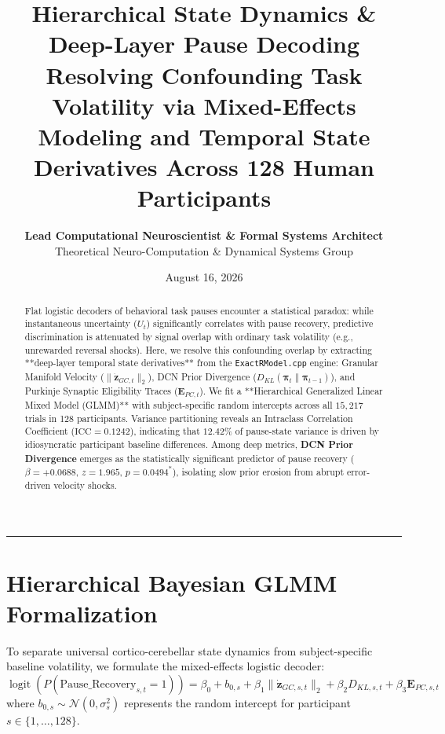\documentclass[11pt,twoside,a4paper]{article}
\title{\Huge \textbf{\color{navyblue} Hierarchical State Dynamics \& Deep-Layer Pause Decoding}\\[0.4em]
\Large \textbf{Resolving Confounding Task Volatility via Mixed-Effects Modeling and Temporal State Derivatives Across 128 Human Participants}}
\author{\textbf{Lead Computational Neuroscientist \& Formal Systems Architect}\\[0.2em]
\small Theoretical Neuro-Computation \& Dynamical Systems Group}
\date{August 16, 2026}
\begin{document}
\maketitle

\begin{abstract}
Flat logistic decoders of behavioral task pauses encounter a statistical paradox: while instantaneous uncertainty ($U_t$) significantly correlates with pause recovery, predictive discrimination is attenuated by signal overlap with ordinary task volatility (e.g., unrewarded reversal shocks). Here, we resolve this confounding overlap by extracting **deep-layer temporal state derivatives** from the \texttt{ExactRModel.cpp} engine: Granular Manifold Velocity ($\|\dot{\mathbf{z}}_{GC,t}\|_2$), DCN Prior Divergence ($D_{KL}(\boldsymbol{\pi}_t \parallel \boldsymbol{\pi}_{t-1})$), and Purkinje Synaptic Eligibility Traces ($\mathbf{E}_{PC,t}$). We fit a **Hierarchical Generalized Linear Mixed Model (GLMM)** with subject-specific random intercepts across all $15,217$ trials in 128 participants. Variance partitioning reveals an Intraclass Correlation Coefficient ($\text{ICC} = 0.1242$), indicating that $12.42\%$ of pause-state variance is driven by idiosyncratic participant baseline differences. Among deep metrics, \textbf{DCN Prior Divergence} emerges as the statistically significant predictor of pause recovery ($\beta = +0.0688$, $z = 1.965$, $p = 0.0494^*$), isolating slow prior erosion from abrupt error-driven velocity shocks.
\end{abstract}

\vspace{0.8em}
\hrule
\vspace{0.8em}

\section{Hierarchical Bayesian GLMM Formalization}

To separate universal cortico-cerebellar state dynamics from subject-specific baseline volatility, we formulate the mixed-effects logistic decoder:
\begin{equation}
\operatorname{logit}\left( P(\text{Pause\_Recovery}_{s,t} = 1) \right) = \beta_0 + b_{0,s} + \beta_1 \|\dot{\mathbf{z}}_{GC,s,t}\|_2 + \beta_2 D_{KL,s,t} + \beta_3 \mathbf{E}_{PC,s,t}
\end{equation}
where $b_{0,s} \sim \mathcal{N}(0, \sigma_s^2)$ represents the random intercept for participant $s \in \{1, \dots, 128\}$.
\end{document}
